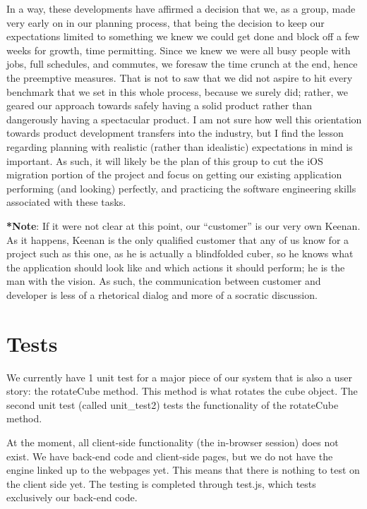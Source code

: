 \documentclass[12pt]{article}
\begin{document}
\par In a way, these developments have affirmed a decision that we, as a group, made very early on in our planning process, that being the decision to keep our expectations limited to something we knew we could get done and block off a few weeks for growth, time permitting. Since we knew we were all busy people with jobs, full schedules, and commutes, we foresaw the time crunch at the end, hence the preemptive measures. That is not to saw that we did not aspire to hit every benchmark that we set in this whole process, because we surely did; rather, we geared our approach towards safely having a solid product rather than dangerously having a  spectacular product. I am not sure how well this orientation towards product development transfers into the industry, but I find the lesson regarding planning with realistic (rather than idealistic) expectations in mind is important. As such, it will likely be the plan of this group to cut the iOS migration portion of the project and focus on getting our existing application performing (and looking) perfectly, and practicing the software engineering skills associated with these tasks. \\

\par \textbf{*Note}: If it were not clear at this point, our “customer” is our very own Keenan. As it happens, Keenan is the only qualified customer that any of us know for a project such as this one, as he is actually a blindfolded cuber, so he knows what the application should look like and which actions it should perform; he is the man with the vision. As such, the communication between customer and developer is less of a rhetorical dialog and more of a socratic discussion. \\

\section{Tests}

\par We currently have 1 unit test for a major piece of our system that is also a user story: the rotateCube method. This method is what rotates the cube object. The second unit test (called unit_test2) tests the functionality of the rotateCube method. \\

\par At the moment, all client-side functionality (the in-browser session) does not exist. We have back-end code and client-side pages, but we do not have the engine linked up to the webpages yet. This means that there is nothing to test on the client side yet. The testing is completed through test.js, which tests exclusively our back-end code. \\
\end{document}

